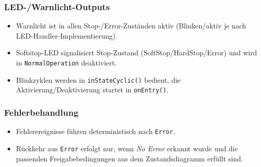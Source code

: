 \subsubsection{LED-/Warnlicht-Outputs}
\begin{itemize}[leftmargin=*, itemsep=2pt]
  \item Warnlicht ist in allen Stop-/Error-Zuständen aktiv (Blinken/aktiv je nach LED-Handler-Implementierung).
  \item Softstop-LED signalisiert Stop-Zustand (SoftStop/HardStop/Error) und wird in \texttt{NormalOperation} deaktiviert.
  \item Blinkzyklen werden in \texttt{inStateCyclic()} bedient, die Aktivierung/Deaktivierung startet in \texttt{onEntry()}.
\end{itemize}

\subsubsection{Fehlerbehandlung}
\begin{itemize}[leftmargin=*, itemsep=2pt]
  \item Fehlerereignisse führen deterministisch nach \texttt{Error}.
  \item Rückkehr aus \texttt{Error} erfolgt nur, wenn \emph{No Error} erkannt wurde und die passenden Freigabebedingungen
        aus dem Zustandsdiagramm erfüllt sind.
\end{itemize}